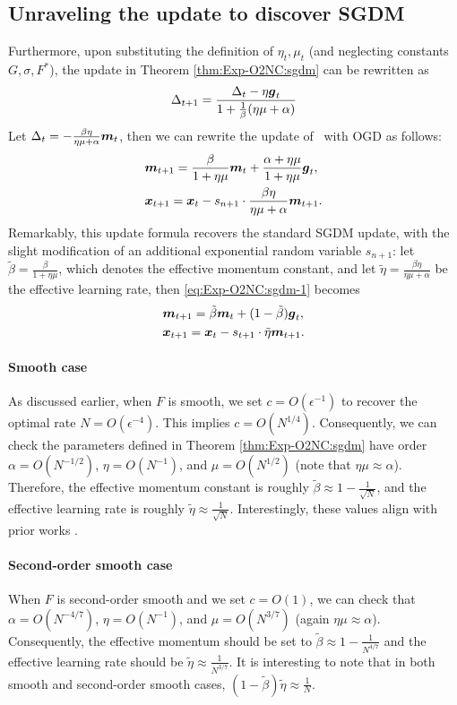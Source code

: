 \subsection{Unraveling the update to discover SGDM}
Furthermore, upon substituting the definition of $\eta_t,\mu_t$ (and neglecting constants $G,\sigma,F^*$), the update in Theorem \ref{thm:Exp-O2NC:sgdm} can be rewritten as
\begin{equation*}
    \Delta_{t+1} = \frac{\Delta_t - \eta{\boldsymbol{g}}_t}{1 + \frac{1}{\beta}(\eta\mu + \alpha)}
\end{equation*}
Let $\Delta_t = -\frac{\beta\eta}{\eta\mu+\alpha}{\boldsymbol{m}}_t$, then we can rewrite the update of \alg \ with OGD as follows:
\begin{align}
    &{\boldsymbol{m}}_{t+1} = \frac{\beta}{1+\eta\mu} {\boldsymbol{m}}_t + \frac{\alpha + \eta\mu}{1+\eta\mu} {\boldsymbol{g}}_t, \notag\\
    &{\boldsymbol{x}}_{t+1} = {\boldsymbol{x}}_t - s_{n+1}\cdot \frac{\beta\eta}{\eta\mu+\alpha} {\boldsymbol{m}}_{t+1}.
    \label{eq:Exp-O2NC:sgdm-1}
\end{align}
Remarkably, this update formula recovers the standard SGDM update, with the slight modification of an additional exponential random variable $s_{n+1}$: let $\tilde\beta = \frac{\beta}{1+\eta\mu}$, which denotes the effective momentum constant, and let $\tilde\eta = \frac{\beta\eta}{\eta\mu+\alpha}$ be the effective learning rate, then \eqref{eq:Exp-O2NC:sgdm-1} becomes
\begin{align}
    &{\boldsymbol{m}}_{t+1} = \tilde\beta {\boldsymbol{m}}_t + (1-\tilde\beta){\boldsymbol{g}}_t, \notag\\
    &{\boldsymbol{x}}_{t+1} = {\boldsymbol{x}}_t - s_{t+1}\cdot \tilde\eta {\boldsymbol{m}}_{t+1}.
    \label{eq:Exp-O2NC:sgdm-2}
\end{align}

\paragraph{Smooth case}
As discussed earlier, when $F$ is smooth, we set $c=O(\epsilon^{-1})$ to recover the optimal rate $N=O(\epsilon^{-4})$. This implies $c=O(N^{1/4})$. Consequently, we can check the parameters defined in Theorem \ref{thm:Exp-O2NC:sgdm} have order $\alpha = O(N^{-1/2})$, $\eta = O(N^{-1})$, and $\mu=O(N^{1/2})$ (note that $\eta\mu\approx \alpha$). Therefore, the effective momentum constant is roughly $\tilde\beta \approx 1-\frac{1}{\sqrt{N}}$, and the effective learning rate is roughly $\tilde\eta\approx \frac{1}{\sqrt{N}}$. Interestingly, these values align with prior works \cite{cutkosky2020momentum}.



\paragraph{Second-order smooth case}
When $F$ is second-order smooth and we set $c=O(1)$, we can check that $\alpha = O(N^{-4/7})$, $\eta=O(N^{-1})$, and $\mu=O(N^{3/7})$ (again $\eta\mu\approx \alpha$). Consequently, the effective momentum should be set to $\tilde\beta \approx 1-\frac{1}{N^{4/7}}$ and the effective learning rate should be $\tilde\eta \approx \frac{1}{N^{3/7}}$. It is interesting to note that in both smooth and second-order smooth cases, $(1-\tilde\beta)\tilde\eta \approx \frac{1}{N}$.